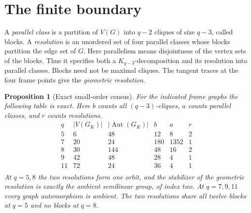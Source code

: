 \documentclass[11pt]{article}
\newtheorem{proposition}[theorem]{Proposition}
\theoremstyle{definition}
\theoremstyle{remark}
\newcommand{\Aut}{\operatorname{Aut}}
\begin{document}
\section{The finite boundary}\label{sec:boundary}

A \emph{parallel class} is a partition of $V(G)$ into $q-2$ cliques
of size $q-3$, called blocks. A \emph{resolution} is an unordered set of
four parallel classes whose blocks partition the edge set of $G$.
Here parallelism means disjointness of the vertex sets of the blocks.
Thus it specifies both a $K_{q-3}$-decomposition and its resolution into
parallel classes. Blocks need not be maximal cliques. The tangent traces
at the four frame points give the \emph{geometric resolution}.

\begin{samepage}
\begin{proposition}[Exact small-order census]\label{prop:boundary}
For the indicated frame graphs the following table is exact. Here $b$
counts all $(q-3)$-cliques, $a$ counts parallel classes,
and $r$ counts resolutions.
\[
\begin{array}{c|r|r|r|r|r}
q&|V(G_K)|&|\Aut(G_K)|&b&a&r\\\hline
5&6&48&12&8&2\\
7&20&24&180&1352&1\\
8&30&144&48&16&2\\
9&42&48&28&4&1\\
11&72&24&36&4&1\\
\end{array}
\]
At $q=5,8$ the two resolutions form one orbit, and the stabilizer of the
geometric resolution is exactly the ambient semilinear group, of index
two. At $q=7,9,11$ every graph automorphism is ambient.
The two resolutions share all twelve blocks at $q=5$ and no blocks at $q=8$.
\end{proposition}
\end{samepage}
\end{document}
